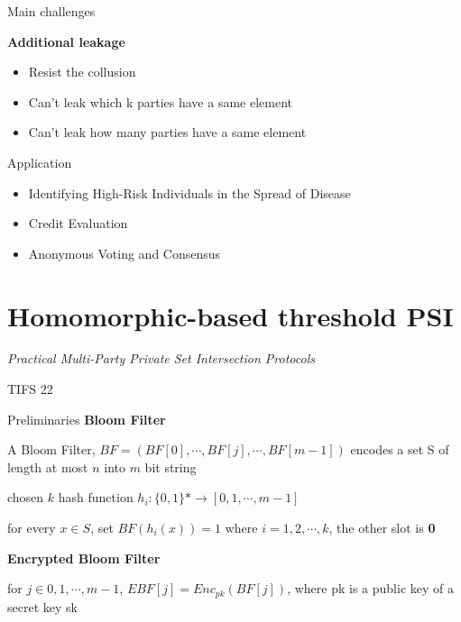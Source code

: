 \begin{frame}{Main challenges}
    
    \textbf{Additional leakage}
    \vspace{0.5cm}
    \begin{itemize}
        \item Resist the collusion
        \item Can't leak which k parties have a same element
        \item Can't leak how many parties have a same element

    \end{itemize}
\end{frame}

\begin{frame}{Application}
    
    \begin{itemize}
        \item Identifying High-Risk Individuals in the Spread of Disease
        \item Credit Evaluation
        \item Anonymous Voting and Consensus
    \end{itemize}


\end{frame}






\section{Homomorphic-based threshold PSI}
\begin{frame}
    \centering \textit{Practical Multi-Party Private Set
    Intersection Protocols}

    \vspace{1cm}
    TIFS 22
\end{frame}

\begin{frame}{Preliminaries}
    \textbf{Bloom Filter}

    \vspace{0.5cm}

    A Bloom Filter, $BF = (BF[0],\cdots, BF[ j ], \cdots , BF[m-1])$ encodes a set S of length at most $n$ into $m$ bit
    string

    chosen $k$ hash function $h_i: \{0,1\}* \rightarrow [0,1,\cdots,m-1 ]$

    for every $x \in S$, set $BF(h_i(x))=1$ where $i = 1,2,\cdots,k$, the other slot is \textbf{0}
    
    \vspace{0.5cm}


    \textbf{Encrypted Bloom Filter}

    \vspace{0.5cm}

    for $j \in 0,1,\cdots,m-1 $,
    $EBF [ j] = Enc_{pk}(BF [ j ])$, where pk is a public key
of a secret key sk

\end{frame}

